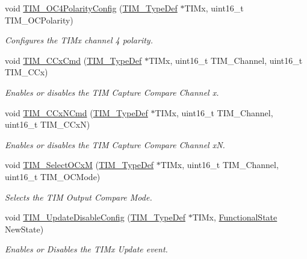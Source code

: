 \begin{DoxyCompactItemize}
void \mbox{\hyperlink{group___t_i_m___private___functions_gad678410f7c7244f83daad93ce9d1056e}{T\+I\+M\+\_\+\+O\+C4\+Polarity\+Config}} (\mbox{\hyperlink{struct_t_i_m___type_def}{T\+I\+M\+\_\+\+Type\+Def}} $\ast$T\+I\+Mx, uint16\+\_\+t T\+I\+M\+\_\+\+O\+C\+Polarity)
\begin{DoxyCompactList}\small\item\em Configures the T\+I\+Mx channel 4 polarity. \end{DoxyCompactList}\item 
void \mbox{\hyperlink{group___t_i_m___private___functions_ga3ecc4647d9ede261beb5e0535cf29ebb}{T\+I\+M\+\_\+\+C\+Cx\+Cmd}} (\mbox{\hyperlink{struct_t_i_m___type_def}{T\+I\+M\+\_\+\+Type\+Def}} $\ast$T\+I\+Mx, uint16\+\_\+t T\+I\+M\+\_\+\+Channel, uint16\+\_\+t T\+I\+M\+\_\+\+C\+Cx)
\begin{DoxyCompactList}\small\item\em Enables or disables the T\+IM Capture Compare Channel x. \end{DoxyCompactList}\item 
void \mbox{\hyperlink{group___t_i_m___private___functions_ga304ff7c8a1615498da749bf2507e9f2b}{T\+I\+M\+\_\+\+C\+Cx\+N\+Cmd}} (\mbox{\hyperlink{struct_t_i_m___type_def}{T\+I\+M\+\_\+\+Type\+Def}} $\ast$T\+I\+Mx, uint16\+\_\+t T\+I\+M\+\_\+\+Channel, uint16\+\_\+t T\+I\+M\+\_\+\+C\+CxN)
\begin{DoxyCompactList}\small\item\em Enables or disables the T\+IM Capture Compare Channel xN. \end{DoxyCompactList}\item 
void \mbox{\hyperlink{group___t_i_m___private___functions_ga83ea0af5a7c1af521236ce5e4d2c42b0}{T\+I\+M\+\_\+\+Select\+O\+CxM}} (\mbox{\hyperlink{struct_t_i_m___type_def}{T\+I\+M\+\_\+\+Type\+Def}} $\ast$T\+I\+Mx, uint16\+\_\+t T\+I\+M\+\_\+\+Channel, uint16\+\_\+t T\+I\+M\+\_\+\+O\+C\+Mode)
\begin{DoxyCompactList}\small\item\em Selects the T\+IM Output Compare Mode. \end{DoxyCompactList}\item 
void \mbox{\hyperlink{group___t_i_m___private___functions_gace2384dd33e849a054f61b8e1fc7e7c3}{T\+I\+M\+\_\+\+Update\+Disable\+Config}} (\mbox{\hyperlink{struct_t_i_m___type_def}{T\+I\+M\+\_\+\+Type\+Def}} $\ast$T\+I\+Mx, \mbox{\hyperlink{group___exported__types_gac9a7e9a35d2513ec15c3b537aaa4fba1}{Functional\+State}} New\+State)
\begin{DoxyCompactList}\small\item\em Enables or Disables the T\+I\+Mx Update event. \end{DoxyCompactList}\item 

\end{DoxyCompactItemize}
